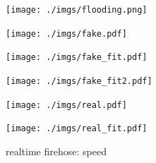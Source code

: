 \documentclass{beamer}
\begin{document}

\begin{frame}
  \begin{center}
    \texttt{[image: ./imgs/flooding.png]}
  \end{center}
\end{frame}


\begin{frame}
\begin{center}
\end{center}
\end{frame}


\begin{frame}
  \begin{center}
    \texttt{[image: ./imgs/fake.pdf]}
  \end{center}
\end{frame}

\begin{frame}
  \begin{center}
    \texttt{[image: ./imgs/fake\_fit.pdf]}
  \end{center}
\end{frame}

\begin{frame}
  \begin{center}
    \texttt{[image: ./imgs/fake\_fit2.pdf]}
  \end{center}
\end{frame}

\begin{frame}
  \begin{center}
    \texttt{[image: ./imgs/real.pdf]}
  \end{center}
\end{frame}

\begin{frame}
  \begin{center}
    \texttt{[image: ./imgs/real\_fit.pdf]}
  \end{center}
\end{frame}


\begin{frame}
\begin{center}
{\Huge realtime firehose: speed}
\end{center}
\end{frame}
\end{document}
